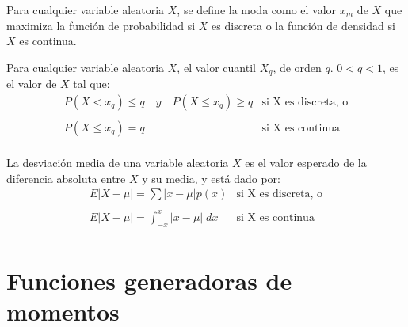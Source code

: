 \begin{tcolorbox}[colframe = white]
    \begin{def.}
	Para cualquier variable aleatoria $X$, se define la moda como el valor $x_m$ de $X$ que maximiza la función de probabilidad si $X$ es discreta o la función de densidad si $X$ es continua.
    \end{def.}
\end{tcolorbox}

\begin{tcolorbox}[colframe = white]
    \begin{def.}
	Para cualquier variable aleatoria $X$, el valor cuantil $X_q$, de orden $q$. $0<q<1$, es el valor de $X$ tal que:
	$$\begin{array}{ll}
	    P(X<x_q) \leq q \quad y \quad P(X\leq x_{q}) \geq q&\mbox{si X es discreta, o}\\\\
	    P(X\leq x_{q}) = q&\mbox{si X es continua}\\
	\end{array}$$
    \end{def.}
\end{tcolorbox}

\begin{tcolorbox}[colframe = white]
    \begin{def.}
	La desviación media de una variable aleatoria $X$ es el valor esperado de la diferencia absoluta entre $X$ y su media, y está dado por:
	$$\begin{array}{ll}
	    E|X-\mu| = \sum |x-\mu| p(x) &\mbox{si X es discreta, o}\\\\
	    E|X-\mu| = \displaystyle\int_{-x}^x |x-\mu|\; dx&\mbox{si X es continua}\\
	\end{array}$$
    \end{def.}
\end{tcolorbox}


\section{Funciones generadoras de momentos}

